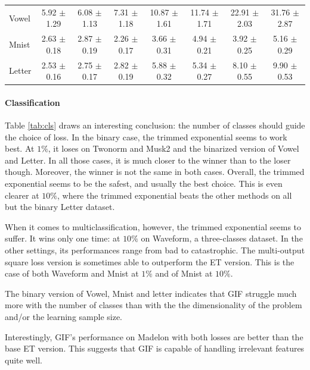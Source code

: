 \documentclass{article}
\newcommand{\bestA}{\cellcolor{orange}}
\newcommand{\bestB}{\cellcolor{dodgerblue}}
\begin{document}
\begin{table}[t]
\begin{center}
\begin{small}
\begin{sc}
\begin{tabular}{l|c|ccc|ccc}
Vowel & 5.92 $\pm$ 1.29 & \bestA 6.08 $\pm$ 1.13 & 7.31 $\pm$ 1.18 & 10.87 
$\pm$ 1.61 & \bestB 11.74 $\pm$ 1.71 & 22.91 $\pm$ 2.03 & 31.76 $\pm$ 2.87 \\
Mnist & 2.63 $\pm$ 0.18 & 2.87 $\pm$ 0.19 & \bestA 2.26 $\pm$ 0.17 & 3.66 $\pm$ 
0.31 & 4.94 $\pm$ 0.21 & \bestB 3.92 $\pm$ 0.25 & 5.16 $\pm$ 0.29 \\
Letter & 2.53 $\pm$ 0.16 & \bestA 2.75 $\pm$ 0.17 & 2.82 $\pm$ 0.19 & 5.88 
$\pm$ 0.32 & \bestB 5.34 $\pm$ 0.27 & 8.10 $\pm$ 0.55 & 9.90 $\pm$ 0.53 \\
\hline
\end{tabular}
\end{sc}
\end{small}
\end{center}
\vskip -0.1in
\end{table}


\paragraph{Classification}
Table \ref{tab:cls} draws an interesting conclusion: the number of classes 
should guide the choice of loss. In the binary case, the trimmed exponential 
seems to work best. At $1\%$, it loses on Twonorm and Musk2 and the binarized 
version of Vowel and Letter. In all those cases, it is much closer to the 
winner than to the loser though. Moreover, the winner is not the same in both 
cases. Overall, the trimmed exponential seems to be the safest, and usually the 
best choice. 
This is even clearer at $10\%$, where the trimmed exponential beats the other 
methods on all but the binary Letter dataset.

When it comes to multiclassification, however, the trimmed exponential seems to 
suffer. It wins only one time: at $10\%$ on Waveform, a three-classes dataset. 
In the other settings, its performances range from bad to catastrophic. The 
multi-output square loss version is sometimes able to outperform the ET 
version. This is the case of both Waveform and Mnist at $1\%$ and of Mnist at 
$10\%$. 

The binary version of Vowel, Mnist and letter indicates that GIF struggle much 
more with the number of classes than with the the dimensionality of the problem 
and/or the learning sample size. 

Interestingly, GIF's performance on Madelon with both losses are better than 
the base ET version. This suggests that GIF is capable of handling irrelevant 
features quite well.
\end{document}
